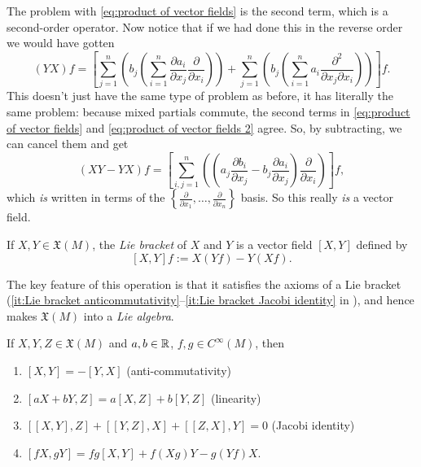 The problem with \eqref{eq:product of vector fields} is the second term, which is a second-order operator. Now notice that if we had done this in the reverse order we would have gotten
\begin{equation}\label{eq:product of vector fields 2}
	(YX)f = \left[ \sum_{j=1}^n \left(b_j \left( \sum_{i=1}^n \frac{\partial a_i}{\partial x_j} \frac{\partial}{\partial x_i}\right)\right) + \sum_{j=1}^n \left(b_j \left(\sum_{i=1}^n a_i \frac{\partial^2}{\partial x_j \partial x_i}\right)\right)\right]f.
\end{equation}
This doesn't just have the same type of problem as before, it has literally the same problem: because mixed partials commute, the second terms in \eqref{eq:product of vector fields} and \eqref{eq:product of vector fields 2} agree. So, by subtracting, we can cancel them and get
\begin{equation}\label{eq:Lie bracket in local coords}
	(XY - YX)f = \left[\sum_{i,j=1}^n \left(\left( a_j \frac{\partial b_i}{\partial x_j} - b_j \frac{\partial a_i}{\partial x_j}\right)\frac{\partial}{\partial x_i}\right)\right]f,
\end{equation}
which \emph{is} written in terms of the $\left\{ \frac{\partial}{\partial x_1}, \dots , \frac{\partial}{\partial x_n}\right\}$ basis. So this really \emph{is} a vector field.

\begin{definition}\label{def:Lie bracket of vector fields}
	If $X,Y \in \mathfrak{X}(M)$, the \emph{Lie bracket} of $X$ and $Y$ is a vector field $[X,Y]$ defined by
	\[
		[X,Y]f := X(Yf)-Y(Xf).
	\]
\end{definition}

The key feature of this operation is that it satisfies the axioms of a Lie bracket (\ref{it:Lie bracket anticommutativity}--\ref{it:Lie bracket Jacobi identity} in ), and hence makes $\mathfrak{X}(M)$ into a \emph{Lie algebra}.

\begin{proposition}\label{prop:Lie bracket}
	If $X,Y,Z \in \mathfrak{X}(M)$ and $a,b \in \mathbb{R}$, $f, g \in C^\infty(M)$, then
	\begin{enumerate}
		\item \label{it:Lie bracket anticommutativity} $[X,Y]=-[Y,X]$ (anti-commutativity)
		\item \label{it:Lie bracket linearity} $[aX+bY,Z]=a[X,Z]+b[Y,Z]$ (linearity)
		\item \label{it:Lie bracket Jacobi identity} $[[X,Y],Z]+[[Y,Z],X]+[[Z,X],Y]=0$ (Jacobi identity)
		\item $[fX,gY]=fg[X,Y]+f(Xg)Y-g(Yf)X$.
	\end{enumerate}
\end{proposition}

